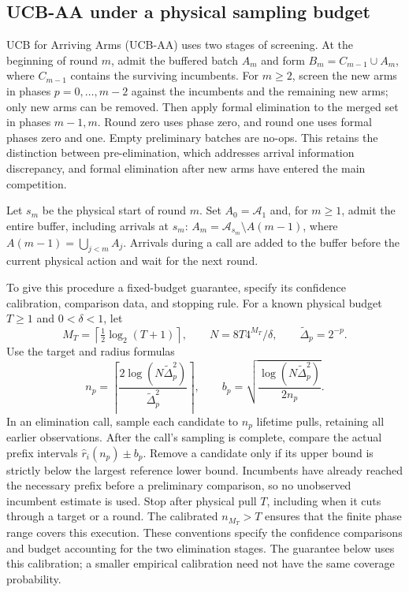 \documentclass[11pt]{article}
\begin{document}
\subsection{UCB-AA under a physical sampling budget}
\label{sec:ucbaa_fixed_budget}

UCB for Arriving Arms (UCB-AA) uses two stages of screening.
At the beginning of round $m$, admit the buffered batch $A_m$ and form
$B_m=C_{m-1}\cup A_m$, where $C_{m-1}$ contains the surviving incumbents.
For $m\ge2$, screen the new arms in phases $p=0,\ldots,m-2$ against
the incumbents and the remaining new arms; only new arms can be removed.
Then apply formal elimination to the merged set in phases $m-1,m$.
Round zero uses phase zero, and round one uses formal phases zero and one.
Empty preliminary batches are no-ops. This retains the distinction between
pre-elimination, which addresses arrival information discrepancy, and
formal elimination after new arms have entered the main competition.

Let $s_m$ be the physical start of round $m$. Set $A_0=\mathcal A_1$ and,
for $m\ge1$, admit the entire buffer, including arrivals at $s_m$:
$A_m=\mathcal A_{s_m}\setminus A(m-1)$, where
$A(m-1)=\bigcup_{j<m}A_j$. Arrivals during a call are added to the
buffer before the current physical action and wait for the next round.

To give this procedure a fixed-budget guarantee, specify its confidence
calibration, comparison data, and stopping rule. For a known physical
budget $T\ge1$ and $0<\delta<1$, let
\begin{equation}
 M_T=\left\lceil\tfrac12\log_2(T+1)\right\rceil,\qquad
 N=8T4^{M_T}/\delta,\qquad\widetilde\Delta_p=2^{-p}.
 \label{eq:ucbaa_main_calibration}
\end{equation}
Use the target and radius formulas
\begin{equation}
 n_p=\left\lceil
       \frac{2\log(N\widetilde\Delta_p^2)}{\widetilde\Delta_p^2}
      \right\rceil,\qquad
 b_p=\sqrt{\frac{\log(N\widetilde\Delta_p^2)}{2n_p}}.
 \label{eq:ucbaa_main_targets}
\end{equation}
In an elimination call, sample each candidate to $n_p$ lifetime pulls,
retaining all earlier observations. After the call's sampling is complete,
compare the actual prefix intervals
$\hat r_i(n_p)\pm b_p$. Remove a candidate only if its upper bound is
strictly below the largest reference lower bound. Incumbents have already
reached the necessary prefix before a preliminary comparison, so no
unobserved incumbent estimate is used. Stop after physical pull $T$,
including when it cuts through a target or a round. The calibrated
$n_{M_T}>T$ ensures that the finite phase range covers this execution.
These conventions specify the confidence comparisons and budget accounting
for the two elimination stages. The guarantee below uses this calibration; a smaller empirical
calibration need not have the same coverage probability.
\end{document}
